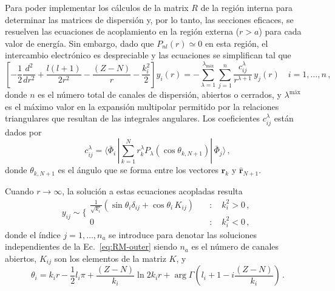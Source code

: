 Para poder implementar los cálculos de la matrix $R$ de la región 
interna para determinar las matrices de dispersión y, por lo tanto, las 
secciones eficaces, se resuelven las ecuaciones de acoplamiento en la 
región externa ($r>a$) para cada valor de energía. Sin embargo, dado 
que $P_{nl}(r)\simeq 0$ en esta región, el intercambio electrónico es
despreciable y las ecuaciones se simplifican tal que
\begin{equation}
\left[-\frac{1}{2}\frac{d^2}{dr^2}+\frac{l(l+1)}{2r^2}-\frac{(Z-N)}{r}
-\frac{k_i^2}{2}\right]y_i(r)=-\sum_{\lambda=1}^{\lambda_{\textrm{máx}}}
\sum_{j=1}^{n}\frac{c_{ij}^{\lambda}}{r^{\lambda+1}}\,y_j(r)
\quad i=1,\dots, n\,,
\label{eq:RM-outer}
\end{equation}
donde $n$ es el número total de canales de dispersión, abiertos o 
cerrados, y $\lambda^{\textrm{máx}}$ es el máximo valor en la expansión
multipolar permitido por la relaciones triangulares que resultan de las 
integrales angulares. Los coeficientes $c_{ij}^{\lambda}$ están dados 
por
\begin{equation}
c_{ij}^{\lambda}=\langle\bar{\Phi}_i\,|\sum_{k=1}^Nr_k^{\lambda}
P_{\lambda}\left(\cos\theta_{k,N+1}\right)|\,\bar{\Phi}_j\rangle\,,
\end{equation}
donde $\theta_{k,N+1}$ es el ángulo que se forma entre los vectores 
$\hat{\mathbf{r}}_{k}$ y $\hat{\mathbf{r}}_{N+1}$. 

Cuando $r\rightarrow\infty$, la solución a estas ecuaciones acopladas
resulta
\begin{equation}
y_{ij}\sim\bigg\{
\begin{array}{ll}
\frac{1}{\sqrt{k_i}}\left(\sin\theta_i\delta_{ij}
+\cos\theta_i\,K_{ij}\right) &\quad:\quad k_i^2>0\,,\\
0 &\quad:\quad k_i^2<0\,,
\end{array}
\end{equation}
donde el índice $j=1,\dots,n_a$ se introduce para denotar las soluciones 
independientes de la Ec.~\ref{eq:RM-outer} siendo $n_a$ es el número de 
canales abiertos, $K_{ij}$ son los elementos de la matriz $K$, y 
\begin{equation}
\theta_i=k_ir-\frac{1}{2}l_i\pi+\frac{(Z-N)}{k_i}\ln 2k_i r +\arg \Gamma
\left(l_i+1-i\frac{(Z-N)}{k_i}\right)\,.
\end{equation}

